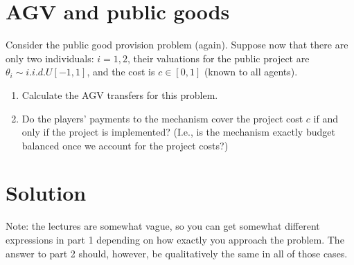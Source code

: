 \documentclass[a4paper]{article}
\newif\ifsolutions
\begin{document}
\ifsolutions
\section*{Solution}
LCT for any $i$ is $\tilde{\theta}_i = -\hat{\theta}$ (you do not actually need to calculate the expectation to find it, since the expression that $\tilde{\theta}_i$ minimizes is weakly monotone in $\theta_i$ -- i.e., one of the edges of the support is the solution). The gVCG transfers are then given by
\begin{align*}
	t_i^{gVCG}(\theta) &= \max \left\{0, \sum_{j\neq i}\theta_j -\hat{\theta} - c \right\} - \left(\sum_{j\neq i}\theta_j -c\right) \cdot \mathbb{I} \left\{ \sum_{j=1}^N \theta_j - c > 0 \right\}
	\\
	&= \begin{cases}
		0	&	\text{ if } \sum_{j=1}^N \theta_j - c \leq 0,
		\\
		-\left(\sum_{j\neq i}\theta_j - c \right)	&	\text{ if }	\sum_{j\neq i} \theta_j - \hat{\theta} - c \leq 0 < \sum_{j=1}^N \theta_j - c,
		\\
		-\hat{\theta}	&	\text{ if } \sum_{j\neq i}\theta_j -\hat{\theta} - c > 0.
	\end{cases}
\end{align*}
\fi



\section{AGV and public goods}

Consider the public good provision problem (again). Suppose now that there are only two individuals: $i=1,2$, their valuations for the public project are $\theta_i \sim i.i.d. U[-1,1]$, and the cost is $c \in [0,1]$ (known to all agents).

\begin{enumerate}
	\item Calculate the AGV transfers for this problem.
	\item Do the players' payments to the mechanism cover the project cost $c$ if and only if the project is implemented? (I.e., is the mechanism exactly budget balanced once we account for the project costs?)
\end{enumerate}

\ifsolutions
\section*{Solution}
Note: the lectures are somewhat vague, so you can get somewhat different expressions in part 1 depending on how exactly you approach the problem. The answer to part 2 should, however, be qualitatively the same in all of those cases.
\end{document}
